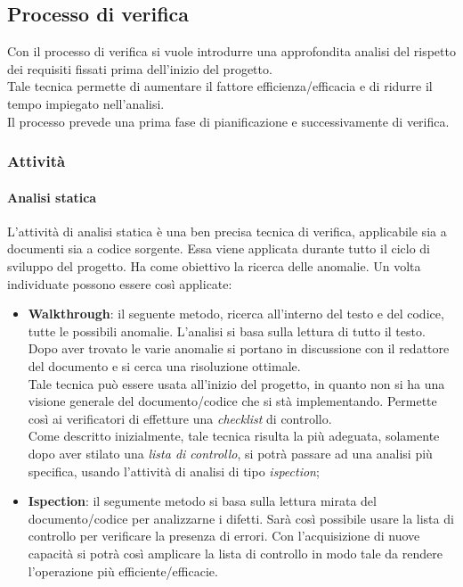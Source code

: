 







	\subsection{Processo di verifica}
	Con il processo di verifica si vuole introdurre una approfondita analisi del rispetto dei requisiti fissati prima dell'inizio del progetto.\\
	Tale tecnica permette di aumentare il fattore efficienza/efficacia e di ridurre il tempo impiegato nell'analisi.\\
	Il processo prevede una prima fase di pianificazione e successivamente di verifica.

		\subsubsection{Attività}
			\paragraph{Analisi statica} %
			\label{par:analisi_statica}
			L'attività di analisi statica è una ben precisa tecnica di verifica, applicabile sia a documenti sia a codice sorgente. Essa viene applicata durante tutto il ciclo di sviluppo del progetto. Ha come obiettivo la ricerca delle anomalie. Un volta individuate possono essere così applicate:
			\begin{itemize}
				\item \textbf{Walkthrough}: il seguente metodo, ricerca all'interno del testo e del codice, tutte le possibili anomalie. L'analisi si basa sulla lettura di tutto il testo.\\
				Dopo aver trovato le varie anomalie si portano in discussione con il redattore del documento e si cerca una risoluzione ottimale.\\
				Tale tecnica può essere usata all'inizio del progetto, in quanto non si ha una visione generale del documento/codice che si stà implementando. Permette così ai verificatori di effetture una \emph{checklist} di controllo.\\
				Come descritto inizialmente, tale tecnica risulta la più adeguata, solamente dopo aver stilato una \emph{lista di controllo}, si potrà passare ad una analisi più specifica, usando l'attività di analisi di tipo \emph{ispection};
				\item \textbf{Ispection}: il segumente metodo si basa sulla lettura mirata del documento/codice per analizzarne i difetti. Sarà così possibile usare la lista di controllo per verificare la presenza di errori. Con l'acquisizione di nuove capacità si potrà così amplicare la lista di controllo in modo tale da rendere l'operazione più efficiente/efficacie.
			\end{itemize}
			
